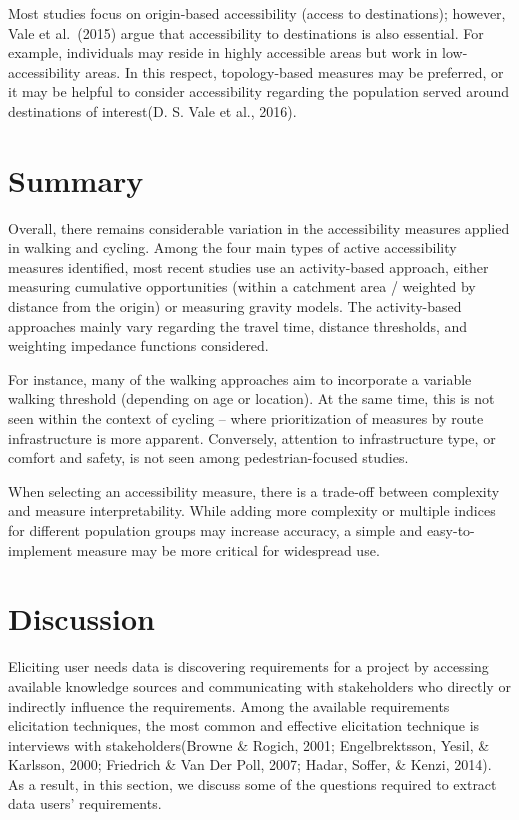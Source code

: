 \documentclass[
11pt, %
oneside, %
english, %
singlespacing, %
]{macthesis} %
\begin{document}
Most studies focus on origin-based accessibility (access to destinations); however, Vale et al.~(2015) argue that accessibility to destinations is also essential. For example, individuals may reside in highly accessible areas but work in low-accessibility areas. In this respect, topology-based measures may be preferred, or it may be helpful to consider accessibility regarding the population served around destinations of interest(D. S. Vale et al., 2016).

\section{Summary}\label{summary}

Overall, there remains considerable variation in the accessibility measures applied in walking and cycling. Among the four main types of active accessibility measures identified, most recent studies use an activity-based approach, either measuring cumulative opportunities (within a catchment area / weighted by distance from the origin) or measuring gravity models. The activity-based approaches mainly vary regarding the travel time, distance thresholds, and weighting impedance functions considered.

For instance, many of the walking approaches aim to incorporate a variable walking threshold (depending on age or location). At the same time, this is not seen within the context of cycling -- where prioritization of measures by route infrastructure is more apparent. Conversely, attention to infrastructure type, or comfort and safety, is not seen among pedestrian-focused studies.

When selecting an accessibility measure, there is a trade-off between complexity and measure interpretability. While adding more complexity or multiple indices for different population groups may increase accuracy, a simple and easy-to-implement measure may be more critical for widespread use.

\section{Discussion}\label{discussion}

Eliciting user needs data is discovering requirements for a project by accessing available knowledge sources and communicating with stakeholders who directly or indirectly influence the requirements. Among the available requirements elicitation techniques, the most common and effective elicitation technique is interviews with stakeholders(Browne \& Rogich, 2001; Engelbrektsson, Yesil, \& Karlsson, 2000; Friedrich \& Van Der Poll, 2007; Hadar, Soffer, \& Kenzi, 2014). As a result, in this section, we discuss some of the questions required to extract data users' requirements.
\end{document}
